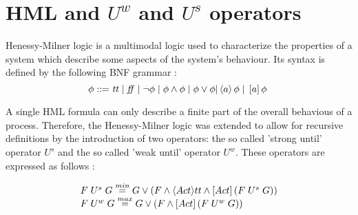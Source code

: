 \section{HML and $U^{w}$ and $U^{s}$ operators}
\label{sec:hml}

Henessy-Milner logic \cite{HenessyMilner} is a multimodal logic used to characterize the properties of a system which describe some aspects of the system's behaviour. Its syntax is defined by the following BNF grammar \cite{ModelingAndAnalysis}:
\begin{equation}\label{eq:hml_bnf}
\phi ::= \mathit{tt} \hspace{1 mm} | \hspace{1 mm} \mathit{ff} \hspace{1 mm} | \hspace{1 mm} \neg\phi \hspace{1 mm} | \hspace{1 mm}\phi\wedge\phi \hspace{1 mm} |
\hspace{1 mm} \phi\vee\phi | \left\langle a\right\rangle \phi \hspace{1 mm} | \hspace{1 mm} \left[a\right]\phi \hspace{1 mm}
\end{equation}

A single HML formula can only describe a finite part of the overall behavious of a process. Therefore, the Henessy-Milner logic was extended to allow for recursive definitions by the introduction of two operators: the so called 'strong until' operator $U^{s}$ and the so called 'weak until' operator $U^{w}$. These operators are expressed as follows \cite{ReactiveSystems}:

\begin{equation}
	\begin{array}{lcl}
		F \hspace{1 mm} U^{s} \hspace{1 mm} G \stackrel{min}{=} G \vee \left(F \wedge \langle Act \rangle tt \wedge \left[Act\right]\left(F \hspace{1 mm} U^{s} \hspace{1 mm} G\right)\right)\\
		F \hspace{1 mm} U^{w} \hspace{1 mm} G \stackrel{max}{=} G \vee \left(F \wedge \left[Act\right] \left(F \hspace{1 mm} U^{w} \hspace{1 mm} G\right)\right)
	\end{array}
\end{equation}

